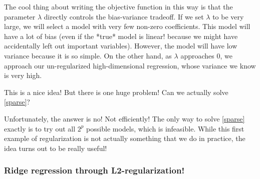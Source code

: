 The cool thing about writing the objective function in this way is that the parameter $\lambda$ directly controls the bias-variance tradeoff. If we set $\lambda$ to be very large, we will select a model with very few non-zero coefficients. This model will have a lot of bias (even if the *true* model is linear! because we might have accidentally left out important variables). However, the model will have low variance because it is so simple. On the other hand, as $\lambda$ approaches $0$, we approach our un-regularized high-dimensional regression, whose variance we know is very high. 

This is a nice idea! But there is one huge problem! Can we actually solve \eqref{sparse}? 

Unfortunately, the answer is no! Not efficiently! The only way to solve \eqref{sparse} exactly is to try out all $2^p$ possible models, which is infeasible. While this first example of regularization is not actually something that we do in practice, the idea turns out to be really useful!  

\subsubsection{Ridge regression through L2-regularization!}

